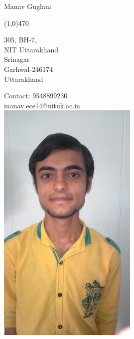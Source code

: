 \documentclass[11pt]{article} %
\begin{document}
\centerline{\Large Manav Guglani}  %
\noindent %
\line(1,0){470}
\\  %
 \parbox[t]{5cm}
{305, BH-7,\\
	NIT Uttarakhand\\
	Srinagar \\
	Garhwal-246174\\
	Uttarakhand}
\hspace{7cm}
\parbox[t]{3.5cm}
{Contact: 9548899230\\
	manav.ece14@nituk.ac.in\\
	\vspace{1pt}
	\includegraphics[scale=.2]{manav.jpg}
}
\end{document}
